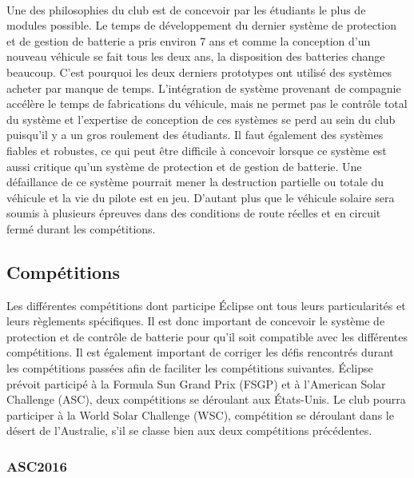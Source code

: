 		\paragraph{}
		Une des philosophies du club est de concevoir par les étudiants le plus de modules possible. Le temps de développement du dernier système de protection et de gestion de batterie a pris environ 7 ans et comme la conception d'un nouveau véhicule se fait tous les deux ans, la disposition des batteries change beaucoup. C'est pourquoi les deux derniers prototypes ont utilisé des systèmes acheter par manque de temps. L'intégration de système provenant de compagnie accélère le temps de fabrications du véhicule, mais ne permet pas le contrôle total du système et l'expertise de conception de ces systèmes se perd au sein du club puisqu'il y a un gros roulement des étudiants. Il faut également des systèmes fiables et robustes, ce qui peut être difficile à concevoir lorsque ce système est aussi critique qu'un système de protection et de gestion de batterie. Une défaillance de ce système pourrait mener la destruction partielle ou totale du véhicule et la vie du pilote est en jeu. D'autant plus que le véhicule solaire sera soumis à plusieurs épreuves dans des conditions de route réelles et en circuit fermé durant les compétitions.
			
		\subsection{Compétitions}
		Les différentes compétitions dont participe Éclipse ont tous leurs particularités et leurs règlements spécifiques. Il est donc important de concevoir le système de protection et de contrôle de batterie pour qu'il soit compatible avec les différentes compétitions. Il est également important de corriger les défis rencontrés durant les compétitions passées afin de faciliter les compétitions suivantes. Éclipse prévoit participé à la Formula Sun Grand Prix (FSGP) et à l'American Solar Challenge (ASC), deux compétitions se déroulant aux États-Unis. Le club pourra participer à la World Solar Challenge (WSC), compétition se déroulant dans le désert de l'Australie, s'il se classe bien aux deux compétitions précédentes.

		
	\subsubsection{ASC2016}
		
